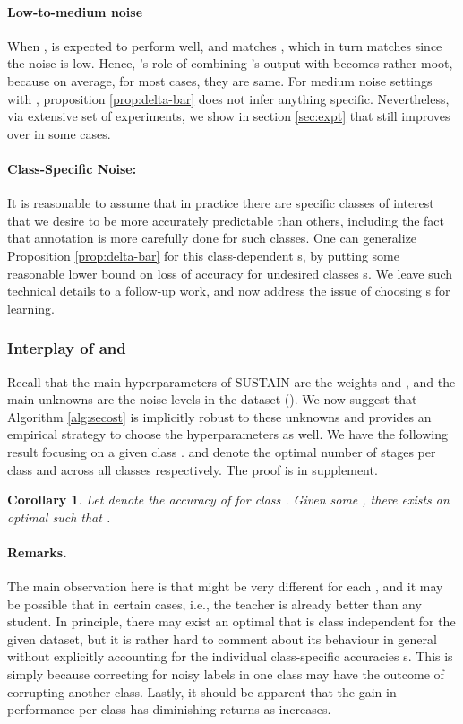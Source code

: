 \documentclass{article}
\newtheorem{corollary}{Corollary}
\begin{document}
\paragraph{Low-to-medium noise }  \label{sec:low-noise}
When ,  is expected to perform well, 
and  matches , which in turn matches  since the noise is low. 
Hence, 's role of combining 's output with  becomes rather moot, because on average, for most cases, they are same. 
For medium noise settings with , proposition \ref{prop:delta-bar} does not infer anything specific. 
Nevertheless, via extensive set of experiments, we show in section \ref{sec:expt} that  still improves over  in some cases. 

\noindent \paragraph{Class-Specific Noise: } \label{sec:different-noise}
It is reasonable to assume that in practice there are specific classes of interest that we desire to be 
more accurately predictable than others, including the fact that annotation is more carefully done for such classes. 
One can generalize Proposition \ref{prop:delta-bar} for this class-dependent s, 
by putting some reasonable lower bound on loss of accuracy for undesired classes s. 
We leave such technical details to a follow-up work, and now address the issue of choosing s for learning.  

\subsubsection{Interplay of  and } \label{sec:alpha-vs-T}

Recall that the main hyperparameters of SUSTAIN are the weights  and , 
and the main unknowns are the noise levels in the dataset ().
We now suggest that Algorithm \ref{alg:secost} is implicitly robust to these unknowns and provides an empirical strategy to choose the hyperparameters as well. 
We have the following result focusing on a given class .  and  denote the optimal number of stages per class  and across all classes respectively. The proof is in supplement. 

\begin{corollary} \label{cor:optimal-T}
Let  denote the accuracy of  for class . 
Given some , there exists an optimal 
such that . 
\end{corollary}

\noindent \paragraph{Remarks.} 
The main observation here is that  might be very different for each , 
and it may be possible that  in certain cases, i.e., the teacher is already better than any student. 
In principle, there may exist an optimal  that is class independent for the given dataset, 
but it is rather hard to comment about its behaviour in general without explicitly accounting for the individual class-specific accuracies s.
This is simply because correcting for noisy labels in one class may have the outcome of corrupting another class. 
Lastly, it should be apparent that the gain in performance per class  has diminishing returns as  increases. 
\end{document}
